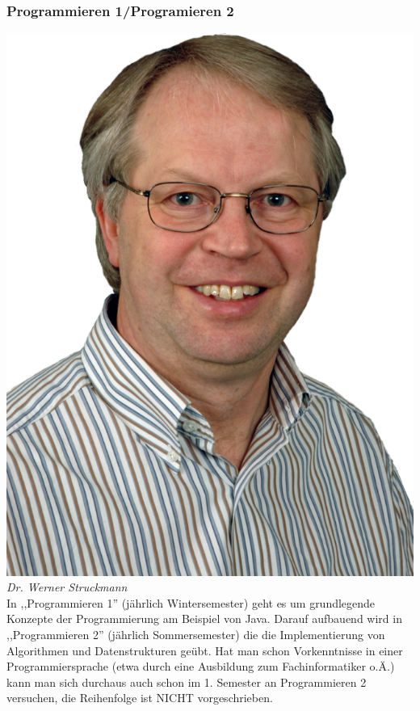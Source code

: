 \subsubsection{Programmieren 1/Programieren 2}
 \includegraphics[width=0.6\linewidth]{bilder/dozenten/struck.png}\\
\textit{Dr. Werner Struckmann}\\
In ,,Programmieren 1'' (jährlich Wintersemester) geht es um grundlegende Konzepte der Programmierung am Beispiel von
Java.  Darauf aufbauend wird in ,,Programmieren 2'' (jährlich Sommersemester) die 
die Implementierung von Algorithmen und Datenstrukturen geübt. 
Hat man  schon Vorkenntnisse in einer Programmiersprache (etwa
durch eine Ausbildung zum Fachinformatiker o.Ä.) kann man sich
durchaus auch schon im 1. Semester an Programmieren 2 versuchen, die
Reihenfolge ist NICHT vorgeschrieben. 



